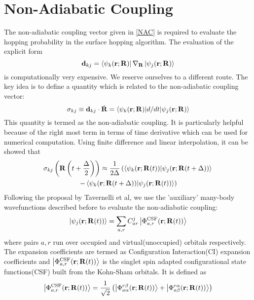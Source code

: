 \section{Non-Adiabatic Coupling}

The non-adiabatic coupling vector given in \eqref{NAC} is required to evaluate the hopping probability in the surface hopping algorithm. The evaluation of the explicit form 
\begin{equation}
   \mathbf{d}_{kj} = \bra{\psi_k(\mathbf{r};\mathbf{R})}\nabla_{\mathbf{R}}\ket{\psi_j(\mathbf{r};\mathbf{R})}
\end{equation}
is computationally very expensive. We reserve ourselves to a different route.\cite{werner_et_al} The key idea is to define a quantity which is related to the non-adiabatic coupling vector: 
\begin{equation}
    \sigma_{kj} \equiv \mathbf{d}_{kj}\cdot\dot{\mathbf{R}} = \mel**{\psi_k(\mathbf{r};\mathbf{R})}{d/dt}{\psi_j(\mathbf{r};\mathbf{R})}
\end{equation}
This quantity is termed as the non-adiabatic coupling. It is particularly helpful because of the right most term in terms of time derivative which can be used for numerical computation. Using finite difference and linear interpolation, it can be showed that\cite{Tully_2}
\begin{multline}\label{nac_appx}
    \sigma_{kj}\left(\mathbf{R}\left(t + \frac{\Delta}{2}\right)\right) \approx \frac{1}{2\Delta}\left(\ip{\psi_k(\mathbf{r};\mathbf{R}(t))}{\psi_j(\mathbf{r};\mathbf{R}(t+\Delta))}  \right.\\\left. - \ip{\psi_k(\mathbf{r};\mathbf{R}(t+\Delta))}{\psi_j(\mathbf{r};\mathbf{R}(t))}\right)
\end{multline}
Following the proposal by Tavernelli et al\cite{nac_tavernelli,nac_tavernelli_2}, we use the 'auxiliary' many-body wavefunctions described before to evaluate the non-adiabatic coupling: 
\begin{equation}\label{ci_expansion}
    \ket{\psi_j(\mathbf{r};\mathbf{R}(t))} = \sum_{a,r}C^j_{ar}\ket{\Phi_{a,r}^{\text{CSF}}(\mathbf{r};\mathbf{R}(t))}
\end{equation}
where pairs $a,r$ run over occupied and virtual(unoccupied) orbitals respectively. The expansion coefficients are termed as Configuration Interaction(CI) expansion coefficients and $\ket{\Phi_{a,r}^{\text{CSF}}(\mathbf{r};\mathbf{R}(t))}$ is the singlet spin adapted configurational state functions(CSF) built from the Kohn-Sham orbitals. It is defined as 
\begin{equation}\label{csf}
    \ket{\Phi_{a,r}^{\text{CSF}}(\mathbf{r};\mathbf{R}(t))} = \frac{1}{\sqrt{2}}\left(\ket{\Phi_{a\alpha}^{r\beta}(\mathbf{r};\mathbf{R}(t))} + \ket{\Phi_{a\beta}^{r\alpha}(\mathbf{r};\mathbf{R}(t))}\right)
\end{equation}
